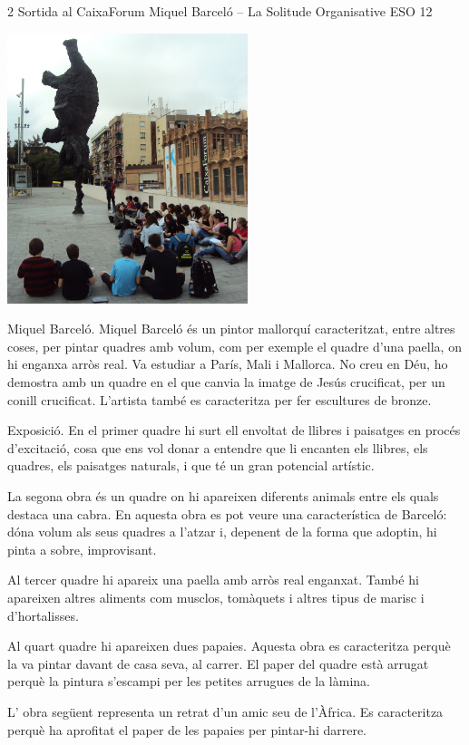 \begin{news}
{2} %
{Sortida al CaixaForum}
{Miquel Barceló – La Solitude Organisative}
{ESO}
{12} %


\noindent\includegraphics[width=7cm,keepaspectratio]{eso/img/barcelo_2.jpg}

Miquel Barceló.
Miquel Barceló és un pintor mallorquí caracteritzat, entre altres coses, per pintar quadres amb volum, com per exemple el quadre d'una paella, on hi enganxa arròs real. Va estudiar a París, Mali i Mallorca. No creu en Déu, ho demostra amb un quadre en el que canvia la imatge de Jesús crucificat, per un conill crucificat. L’artista també es caracteritza per fer escultures de bronze.

Exposició.
En el primer quadre hi surt ell envoltat de llibres i paisatges en procés d'excitació, cosa que ens vol donar a entendre que li encanten els llibres, els quadres, els paisatges naturals, i que té un gran potencial artístic.

La segona obra és un quadre on hi apareixen diferents animals entre els quals destaca una cabra. En aquesta obra es pot veure una característica de Barceló: dóna volum als seus quadres a l’atzar i, depenent de la forma que adoptin, hi pinta a sobre, improvisant.

Al tercer quadre hi apareix una paella amb arròs real enganxat. També hi apareixen altres aliments com musclos, tomàquets i altres tipus de marisc i d’hortalisses. 

Al quart quadre hi apareixen dues papaies. Aquesta obra es caracteritza perquè la va pintar davant de casa seva, al carrer. El paper del quadre està arrugat perquè la pintura s’escampi per les petites arrugues de la làmina.

L’ obra següent representa un retrat d’un amic seu de l’Àfrica. Es caracteritza perquè ha aprofitat el paper de les papaies per pintar-hi darrere.
 

\end{news}

